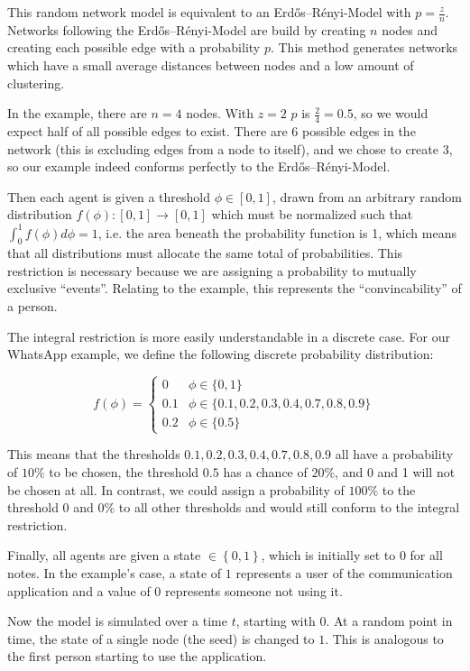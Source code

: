 \documentclass{sig-alternate-05-2015}
\begin{document}
This random network model is equivalent to an Erdős–Rényi-Model with $p = \frac{z}{n}$. Networks following the Erdős–Rényi-Model are build by creating $n$ nodes and creating each possible edge with a probability $p$. This method generates networks which have a small average distances between nodes and a low amount of clustering.

In the example, there are $n = 4$ nodes. With $z = 2$ $p$ is $\frac{2}{4} = 0.5$, so we would expect half of all possible edges to exist. There are 6 possible edges in the network (this is excluding edges from a node to itself), and we chose to create 3, so our example indeed conforms perfectly to the Erdős–Rényi-Model.

Then each agent is given a threshold $\phi \in [0,1]$, drawn from an arbitrary random distribution $f(\phi): [0,1] \rightarrow [0,1]$ which must be normalized such that $\int_0^1 f(\phi) d\phi = 1$, i.e. the area beneath the probability function is 1, which means that all distributions must allocate the same total of probabilities. This restriction is necessary because we are assigning a probability to mutually exclusive ``events''. Relating to the example, this represents the ``convincability'' of a person.

The integral restriction is more easily understandable in a discrete case. For our WhatsApp example, we define the following discrete probability distribution:

$$
f(\phi) =
  \begin{cases}
    0 & \phi \in \{0, 1\} \\
    0.1 & \phi \in \{0.1, 0.2, 0.3, 0.4, 0.7, 0.8, 0.9\} \\
    0.2 & \phi \in \{0.5\}
  \end{cases}
$$

This means that the thresholds $0.1, 0.2, 0.3, 0.4, 0.7, 0.8, 0.9$ all have a probability of $10\%$ to be chosen, the threshold $0.5$ has a chance of $20\%$, and 0 and 1 will not be chosen at all. In contrast, we could assign a probability of $100\%$ to the threshold 0 and $0\%$ to all other thresholds and would still conform to the integral restriction.

Finally, all agents are given a state $\in \left\lbrace 0, 1 \right\rbrace$, which is initially set to $0$ for all notes. In the example's case, a state of $1$ represents a user of the communication application and a value of $0$ represents someone not using it.

Now the model is simulated over a time $t$, starting with $0$. At a random point in time, the state of a single node (the seed) is changed to $1$. This is analogous to the first person starting to use the application.
\end{document}
